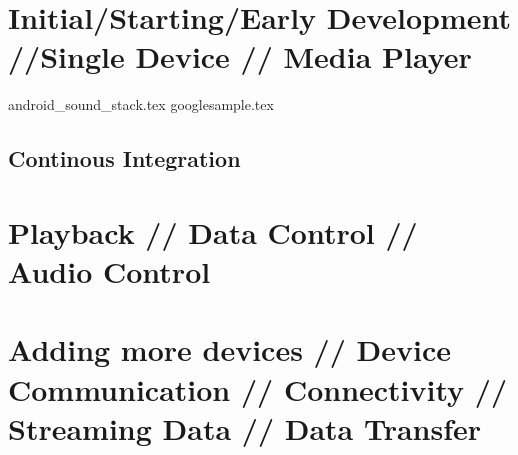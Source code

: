 \chapter{Initial/Starting/Early Development //Single Device // Media Player}
{android_sound_stack.tex}
{googlesample.tex}
\section{Continous Integration}
\chapter{Playback // Data Control // Audio Control}
\chapter{Adding more devices // Device Communication // Connectivity // Streaming Data // Data Transfer}
